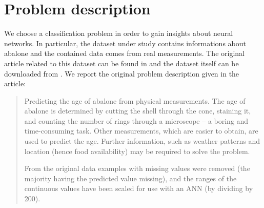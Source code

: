 \documentclass[10pt,a4paper]{article}
\begin{document}
\title{\rmfamily\normalfont{}} 
    \author{Student:  \\
    Professor: } \date{\today}
    
    \maketitle

    \begin{abstract}
      This short document collects the work I did in order to support my
      Neural Network course final exam. The goal is to study neural networks
      using different training functions in order to test them against a dataset
      which holds data about abalone. Here I describe my experience, giving an
      outline of the problem and its application environment, the structure of dataset used in
      experiments and a comparison of classification's results obtained applying different training functions.
      \end{abstract}
       
     

    \section{Problem description}
    
    We choose a classification problem in order to gain insights about neural networks.
    In particular, the dataset under study contains informations about abalone and
    the contained data comes from real measurements. The original article related to this
    dataset can be found in \cite{Nash-Sellers-Talbot-Cawthorn-Ford} and the dataset itself
    can be downloaded from \cite{ml-berkeley-dataset-url}. We report the original 
    problem description given in the article:
    \begin{quote}
    Predicting the age of abalone from physical measurements.  The age of
    abalone is determined by cutting the shell through the cone, staining it,
    and counting the number of rings through a microscope -- a boring and
    time-consuming task.  Other measurements, which are easier to obtain, are
    used to predict the age.  Further information, such as weather patterns
    and location (hence food availability) may be required to solve the problem.

    From the original data examples with missing values were removed (the
     majority having the predicted value missing), and the ranges of the
    continuous values have been scaled for use with an ANN (by dividing by 200).
    \end{quote}
\end{document}
